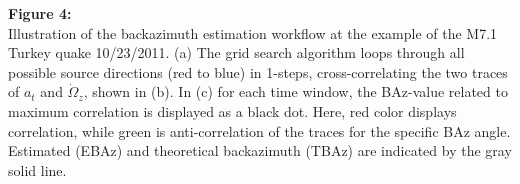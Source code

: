 \documentclass[12pt,reqno,letter]{article}
\begin{document}
\noindent
\textbf{Figure 4:} \\
Illustration of the backazimuth estimation workflow at the example of the M7.1 Turkey quake 10/23/2011. (a) The grid search algorithm loops through all possible source directions (red to blue) in 1\textdegree -steps, cross-correlating the two traces of $a_t$ and $\dot{\Omega}_z$, shown in (b). In (c) for each time window, the BAz-value related to maximum correlation is displayed as a black dot. Here, red color displays correlation, while green is anti-correlation of the traces for the specific BAz angle. Estimated (EBAz) and theoretical backazimuth (TBAz) are indicated by the gray solid line.   
\noindent   
\end{document}
